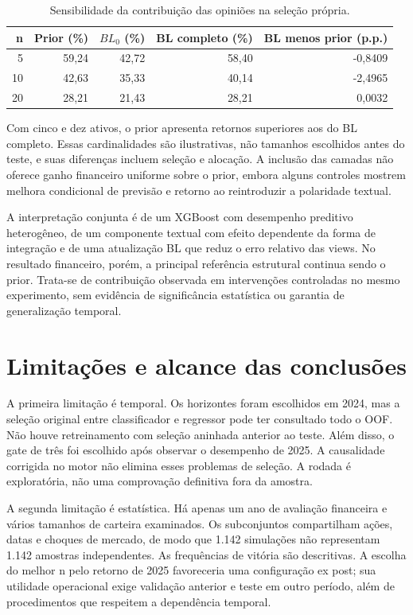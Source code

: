 \begin{table}[H]\centering
\caption{Sensibilidade da contribuição das opiniões na seleção própria.}
\label{tab:financeiro_camadas_selecao}
{\footnotesize\setlength{\tabcolsep}{4pt}\begin{tabular}{rrrrr}\hline
n & Prior (\%) & $BL_0$ (\%) & BL completo (\%) & BL menos prior (p.p.)\\ \hline
5 & 59,24 & 42,72 & 58,40 & -0,8409\\
10 & 42,63 & 35,33 & 40,14 & -2,4965\\
20 & 28,21 & 21,43 & 28,21 & 0,0032\\
\hline\end{tabular}}
\par{}
\end{table}

Com cinco e dez ativos, o prior apresenta retornos superiores aos do BL completo. Essas cardinalidades são ilustrativas, não tamanhos escolhidos antes do teste, e suas diferenças incluem seleção e alocação. A inclusão das camadas não oferece ganho financeiro uniforme sobre o prior, embora alguns controles mostrem melhora condicional de previsão e retorno ao reintroduzir a polaridade textual.

A interpretação conjunta é de um XGBoost com desempenho preditivo heterogêneo, de um componente textual com efeito dependente da forma de integração e de uma atualização BL que reduz o erro relativo das views. No resultado financeiro, porém, a principal referência estrutural continua sendo o prior. Trata-se de contribuição observada em intervenções controladas no mesmo experimento, sem evidência de significância estatística ou garantia de generalização temporal.

\section{Limitações e alcance das conclusões}
A primeira limitação é temporal. Os horizontes foram escolhidos em 2024, mas a seleção original entre classificador e regressor pode ter consultado todo o OOF. Não houve retreinamento com seleção aninhada anterior ao teste. Além disso, o gate de três foi escolhido após observar o desempenho de 2025. A causalidade corrigida no motor não elimina esses problemas de seleção. A rodada é exploratória, não uma comprovação definitiva fora da amostra.

A segunda limitação é estatística. Há apenas um ano de avaliação financeira e vários tamanhos de carteira examinados. Os subconjuntos compartilham ações, datas e choques de mercado, de modo que 1.142 simulações não representam 1.142 amostras independentes. As frequências de vitória são descritivas. A escolha do melhor n pelo retorno de 2025 favoreceria uma configuração ex post; sua utilidade operacional exige validação anterior e teste em outro período, além de procedimentos que respeitem a dependência temporal.

